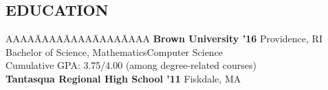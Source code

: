 \documentclass{res}
\begin{document}
\begin{resume}
\myvspace
\section{EDUCATION}     
\myvspace
\begin{tabbing}
AAAA\=AAAA\=AAAA\=AAAA\=AAAA\kill
{\bf Brown University '16} Providence, RI\\
	\>Bachelor of Science, Mathematics\textemdash Computer Science\\
	\>Cumulative GPA: 3.75/4.00 (among degree-related courses)\\
\sbreak
{\bf Tantasqua Regional High School '11} Fiskdale, MA\\%
\end{tabbing}
\sectionVspace %

\end{resume}
\end{document}
